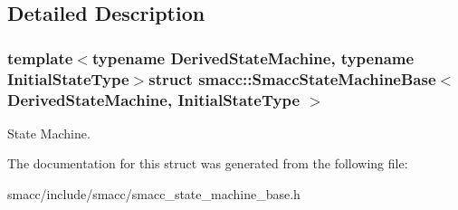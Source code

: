 \subsection{Detailed Description}
\subsubsection*{template$<$typename Derived\-State\-Machine, typename Initial\-State\-Type$>$struct smacc\-::\-Smacc\-State\-Machine\-Base$<$ Derived\-State\-Machine, Initial\-State\-Type $>$}

State Machine. 

The documentation for this struct was generated from the following file\-:\begin{DoxyCompactItemize}
\item 
smacc/include/smacc/smacc\-\_\-state\-\_\-machine\-\_\-base.\-h\end{DoxyCompactItemize}
